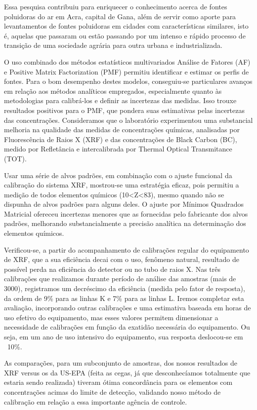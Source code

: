 Essa pesquisa contribuiu para enriquecer o conhecimento acerca de fontes poluidoras do ar em Acra, capital de Gana, além de servir como aporte para levantamentos de fontes poluidoras em cidades com características similares, isto é, aquelas que passaram ou estão passando por um intenso e rápido processo de transição de uma sociedade agrária para outra urbana e industrializada.

O uso combinado dos métodos estatísticos multivariados Análise de Fatores (AF) e Positive Matrix Factorization (PMF) permitiu identificar e estimar os perfis de fontes. Para o bom desempenho destes modelos, conseguiu-se particulares avanços em relação aos métodos analíticos empregados, especialmente quanto às metodologias para calibrá-los e definir as incertezas das medidas. Isso trouxe resultados positivos para o PMF, que pondera suas estimativas pelas incertezas das concentrações. Consideramos que o laboratório experimentou uma substancial melhoria na qualidade das medidas de concentrações químicas, analisadas por Fluorescência de Raios X (XRF) e das concentrações de Black Carbon (BC), medido por Refletância e intercalibrada por Thermal Optical Transmitance (TOT). 

Usar uma série de alvos padrões, em combinação com o ajuste funcional da calibração do sistema XRF, mostrou-se uma estratégia eficaz, pois permitiu a medição de todos elementos químicos (10<Z<83), mesmo quando não se dispunha de alvos padrões para alguns deles. O ajuste por Mínimos Quadrados Matricial ofereceu incertezas menores que as fornecidas pelo fabricante dos alvos padrões, melhorando substancialmente a precisão analítica na determinação dos elementos químicos.

Verificou-se, a partir do acompanhamento de calibrações regular do equipamento de XRF, que a sua eficiência decai com o uso, fenômeno natural, resultado de possível perda na eficiência do detector ou no tubo de raios X. Nas três calibrações que realizamos durante período de análise das amostras (mais de 3000), registramos um decréscimo da eficiência (medida pelo fator de resposta), da ordem de 9\% para as linhas K e 7\% para as linhas L. Iremos completar esta avaliação, incorporando outras calibrações e uma estimativa baseada em horas de uso efetivo do equipamento, mas esses valores permitem dimensionar a necessidade de calibrações em função da exatidão necessária do equipamento. Ou seja, em um ano de uso intensivo do equipamento, sua resposta deslocou-se em ~10\%.

As comparações, para um subconjunto de amostras, dos nossos resultados de XRF versus os da US-EPA (feita as cegas, já que desconhecíamos totalmente que estaria sendo realizada) tiveram ótima concordância para os elementos com concentrações acimas do limite de detecção, validando nosso método de calibração em relação a essa importante agência de controle.

